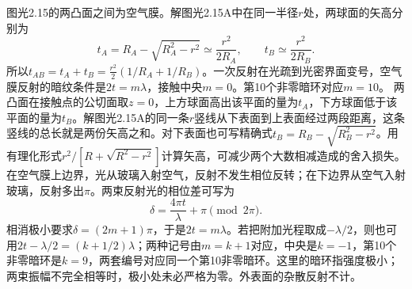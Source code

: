 \documentclass[UTF8,fontset=fandol,a4paper,11pt]{ctexart}
\begin{document}
图光2.15的两凸面之间为空气膜。解图光2.15A中在同一半径$r$处，两球面的矢高分别为
\[
t_A=R_A-\sqrt{R_A^2-r^2}\simeq\frac{r^2}{2R_A},\qquad
t_B\simeq\frac{r^2}{2R_B}.
\]
所以$t_{AB}=t_A+t_B=\frac{r^2}{2}(1/R_A+1/R_B)$。一次反射在光疏到光密界面变号，空气膜反射的暗纹条件是$2t=m\lambda$，接触中央$m=0$。第10个非零暗环对应$m=10$。
两凸面在接触点的公切面取$z=0$，上方球面高出该平面的量为$t_A$，下方球面低于该平面的量为$t_B$。解图光2.15A的同一条$r$竖线从下表面到上表面经过两段距离，这条竖线的总长就是两份矢高之和。对下表面也可写精确式$t_B=R_B-\sqrt{R_B^2-r^2}$。用有理化形式$r^2/[R+\sqrt{R^2-r^2}]$计算矢高，可减少两个大数相减造成的舍入损失。
在空气膜上边界，光从玻璃入射空气，反射不发生相位反转；在下边界从空气入射玻璃，反射多出$\pi$。两束反射光的相位差可写为
\[
\delta=\frac{4\pi t}{\lambda}+\pi\pmod{2\pi}.
\]
相消极小要求$\delta=(2m+1)\pi$，于是$2t=m\lambda$。若把附加光程取成$-\lambda/2$，则也可用$2t-\lambda/2=(k+1/2)\lambda$；两种记号由$m=k+1$对应，中央是$k=-1$，第10个非零暗环是$k=9$，两套编号对应同一个第10非零暗环。这里的暗环指强度极小；两束振幅不完全相等时，极小处未必严格为零。外表面的杂散反射不计。
\end{document}
